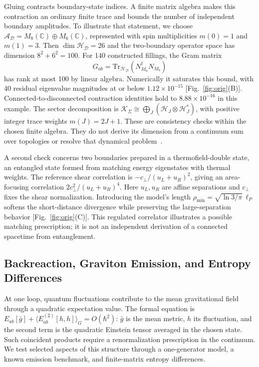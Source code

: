 \documentclass[onecolumn,11pt,aps,prd,amsmath,amssymb,nofootinbib,floatfix]{revtex4-2}
\newcommand{\scrD}{\mathscr{D}}
\newcommand{\calH}{\mathcal{H}}
\newcommand{\calA}{\mathcal{A}}
\newcommand{\calK}{\mathcal{K}}
\newcommand{\lP}{\ell_P}
\newcommand{\Tr}{\mathrm{Tr}}
\begin{document}
Gluing contracts boundary-state indices. A finite matrix algebra makes this contraction an ordinary finite trace and bounds the number of independent boundary amplitudes. To illustrate that statement, we choose $\calA_{\scrD}=M_8(\mathbb{C})\oplus M_6(\mathbb{C})$, represented with spin multiplicities $m(0)=1$ and $m(1)=3$. Then $\dim\calH_{\scrD}=26$ and the two-boundary operator space has dimension $8^2+6^2=100$. For 140 constructed fillings, the Gram matrix
\begin{equation}
G_{ab}=\Tr_{\calH_{\scrD}}(N_{M_a}^{\dagger}N_{M_b})
\end{equation}
has rank at most 100 by linear algebra. Numerically it saturates this bound, with 40 residual eigenvalue magnitudes at or below $1.12\times10^{-15}$ [Fig.~\ref{fig:orig}(B)]. Connected-to-disconnected contraction identities hold to $8.88\times10^{-16}$ in this example. The sector decomposition is $\calK_\Sigma\cong\bigoplus_J(\calH_J\otimes\calH_J^*)$, with positive integer trace weights $m(J)=2J+1$. These are consistency checks within the chosen finite algebra. They do not derive its dimension from a continuum sum over topologies or resolve that dynamical problem~\cite{MarolfMaxfield2020}.

A second check concerns two boundaries prepared in a thermofield-double state, an entangled state formed from matching energy eigenstates with thermal weights. The reference shear correlation is $-c_\perp/(u_L+u_R)^2$, giving an area-focusing correlation $2c_\perp^2/(u_L+u_R)^4$. Here $u_L,u_R$ are affine separations and $c_\perp$ fixes the shear normalization. Introducing the model's length $\rho_{\min}=\sqrt{\ln3/\pi}\,\lP$ softens the short-distance divergence while preserving the large-separation behavior [Fig.~\ref{fig:orig}(C)]. This regulated correlator illustrates a possible matching prescription; it is not an independent derivation of a connected spacetime from entanglement.


\subsection{Backreaction, Graviton Emission, and Entropy Differences}\label{sec:orig_6}

At one loop, quantum fluctuations contribute to the mean gravitational field through a quadratic expectation value. The formal equation is $E_{ab}[\bar g]+\langle E_{ab}^{(2)}[h,h]\rangle_G=O(\hbar^2)$: $\bar g$ is the mean metric, $h$ its fluctuation, and the second term is the quadratic Einstein tensor averaged in the chosen state. Such coincident products require a renormalization prescription in the continuum. We test selected aspects of this structure through a one-generator model, a known emission benchmark, and finite-matrix entropy differences.
\end{document}
